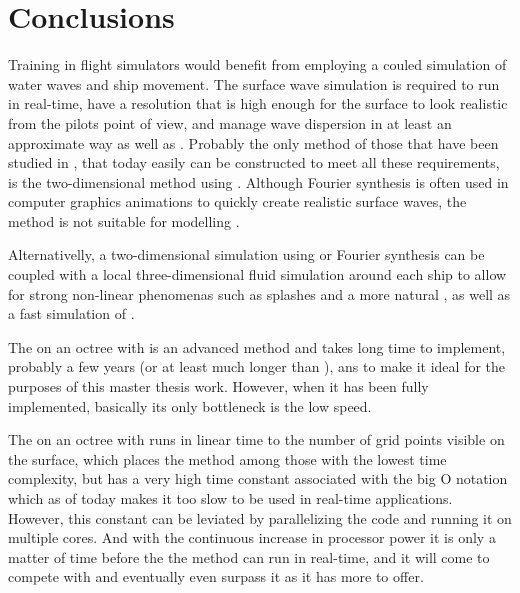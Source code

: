 \chapter{Conclusions}

Training in flight simulators would benefit from employing a couled simulation of water waves and ship movement. The surface wave simulation is required to run in real-time, have a resolution that is high enough for the surface to look realistic from the pilots point of view, and manage wave dispersion in at least an approximate way as well as \FSI. Probably the only method of those that have been studied in \thismasterthesiswork, that today easily can be constructed to meet all these requirements, is the two-dimensional method using \LPD. Although Fourier synthesis is often used in computer graphics animations to quickly create realistic surface waves, the method is not suitable for modelling \FSI.

Alternativelly, a two-dimensional simulation using \LPD or Fourier synthesis can be coupled with a local three-dimensional fluid simulation around each ship to allow for strong non-linear phenomenas such as splashes and a more natural \FSI, as well as a fast simulation of .

The \FVM on an octree with \FSM is an advanced method and takes long time to implement, probably a few years (or at least much longer than \masterthesisworktime), ans to make it ideal for the purposes of this master thesis work. However, when it has been fully implemented, basically its only bottleneck is the low speed.

The \FVM on an octree with \FSM runs in linear time to the number of grid points visible on the surface, which places the method among those with the lowest time complexity, but has a very high time constant associated with the big O notation which as of today makes it too slow to be used in real-time applications. However, this constant can be leviated by parallelizing the code and running it on multiple cores. And with the continuous increase in processor power it is only a matter of time before the the method can run in real-time, and it will come to compete with \LPD and eventually even surpass it as it has more to offer.